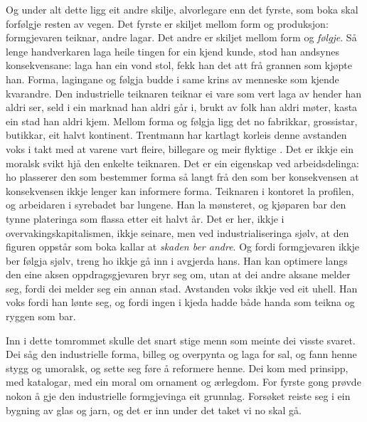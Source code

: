 Og under alt dette ligg eit andre skilje, alvorlegare enn det fyrste, som boka skal forfølgje resten av vegen. Det fyrste er skiljet mellom form og produksjon: formgjevaren teiknar, andre lagar. Det andre er skiljet mellom form og \emph{følgje}. Så lenge handverkaren laga heile tingen for ein kjend kunde, stod han andsynes konsekvensane: laga han ein vond stol, fekk han det att frå grannen som kjøpte han. Forma, lagingane og følgja budde i same krins av menneske som kjende kvarandre. Den industrielle teiknaren teiknar ei vare som vert laga av hender han aldri ser, seld i ein marknad han aldri går i, brukt av folk han aldri møter, kasta ein stad han aldri kjem. Mellom forma og følgja ligg det no fabrikkar, grossistar, butikkar, eit halvt kontinent. Trentmann har kartlagt korleis denne avstanden voks i takt med at varene vart fleire, billegare og meir flyktige \autocite{trentmann2016}. Det er ikkje ein moralsk svikt hjå den enkelte teiknaren. Det er ein eigenskap ved arbeidsdelinga: ho plasserer den som bestemmer forma så langt frå den som ber konsekvensen at konsekvensen ikkje lenger kan informere forma. Teiknaren i kontoret la profilen, og arbeidaren i syrebadet bar lungene. Han la mønsteret, og kjøparen bar den tynne plateringa som flassa etter eit halvt år. Det er her, ikkje i overvakingskapitalismen, ikkje seinare, men ved industrialiseringa sjølv, at den figuren oppstår som boka kallar at \emph{skaden ber andre}. Og fordi formgjevaren ikkje ber følgja sjølv, treng ho ikkje gå inn i avgjerda hans. Han kan optimere langs den eine aksen oppdragsgjevaren bryr seg om, utan at dei andre aksane melder seg, fordi dei melder seg ein annan stad. Avstanden voks ikkje ved eit uhell. Han voks fordi han lønte seg, og fordi ingen i kjeda hadde både handa som teikna og ryggen som bar.

\vignett

Inn i dette tomrommet skulle det snart stige menn som meinte dei visste svaret. Dei såg den industrielle forma, billeg og overpynta og laga for sal, og fann henne stygg og umoralsk, og sette seg føre å reformere henne. Dei kom med prinsipp, med katalogar, med ein moral om ornament og ærlegdom. For fyrste gong prøvde nokon å gje den industrielle formgjevinga eit grunnlag. Forsøket reiste seg i ein bygning av glas og jarn, og det er inn under det taket vi no skal gå.


